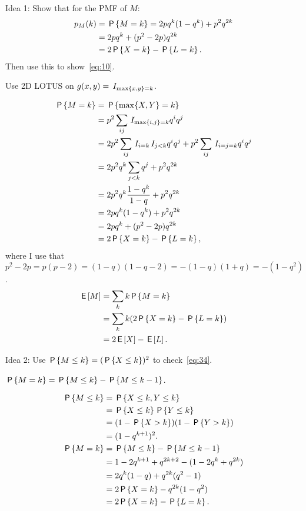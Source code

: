 \documentclass[a4paper,11pt]{article}
\begin{document}
\begin{exercise}\label{ex:1}
Idea 1: Show that for the PMF of $M$:
\begin{align}
p_M(k) &= \P{M=k} = 2 pq^{k}(1-q^{k}) + p^2q^{2k} \\
&=2 pq^{k} +(p^{2}-2p) q^{2k} \label{eq:18}\\
&=2 \P{X=k} - \P{L=k}. \label{eq:34}
\end{align}
Then use this to show~\cref{eq:10}.
\begin{hint}
  Use 2D LOTUS on $g(x,y) = \1{\max\{x, y\} = k}$.
\end{hint}
\begin{solution}
  \begin{align}
    \label{eq:14}
\P{M=k}
&= \P{\max\{X, Y\} = k} \\
&=p^{2}\sum_{ij}\1{\max\{i,j\} =k} q^i q^j\\
&=2 p^{2}\sum_{ij}\1{i=k}\1{j < k} q^i q^j + p^{2}\sum_{ij}\1{i=j=k} q^{i} q^j \\
&=2 p^{2}q^{k}\sum_{j < k} q^j + p^{2}q^{2k}\\
&=2 p^{2}q^{k}\frac{1-q^{k}}{1-q} +  p^{2}q^{2k}\\
&=2 pq^{k}(1-q^{k}) + p^{2}q^{2k}\\
&=2 pq^{k} +(p^{2}-2p) q^{2k} \label{eq:18}\\
&=2 \P{X=k} - \P{L=k},
  \end{align}
where I use that $p^{2}-2p = p(p-2) = (1-q)(1-q-2)=-(1-q)(1+q)=-(1-q^{2})$.
  \begin{align}
    \label{eq:15}
\E M
&= \sum_k k \P{M=k}     \\
&=  \sum_{k}k (2\P{X=k} - \P{L=k}) \\
&= 2 \E X  - \E L.
  \end{align}
\end{solution}
\end{exercise}

\begin{exercise}
Idea 2: Use  $\P{M\leq k} = (\P{X\leq k})^{2}$  to check~\cref{eq:34}.
\begin{hint}
$\P{M=k} = \P{M\leq k} - \P{M\leq k-1}$.
\end{hint}
\begin{solution}
  \begin{align}
    \label{eq:16}
\P{M\leq k}
&= \P{X\leq k, Y\leq k} \\
&= \P{X\leq k}\P{Y\leq k} \\
&= (1-\P{X> k})(1-\P{Y> k}) \\
&= (1-q^{k+1})^{2}.\\
\P{M=k} &= \P{M\leq k} - \P{M\leq k-1}\\
&= 1-2 q^{k+1} + q^{2k+2} - (1 - 2q^{k} + q^{2k})\\
&= 2 q^{k}(1-q) + q^{2k}(q^{2}-1) \\
&= 2 \P{X=k}  - q^{2k}(1-q^{2}) \\
&= 2 \P{X=k}  - \P{L=k}.
  \end{align}
\end{solution}
\end{exercise}
\end{document}
